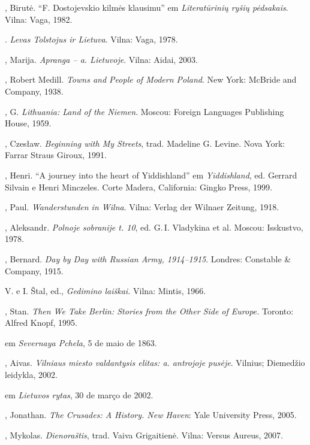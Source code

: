 \begin{bibliohedra}
  , Birutė. ``F. Dostojevskio kilmės klausimu'' em
  \textit{Literatūrinių ryšių pėdsakais}. Vilna: Vaga, 1982.

  \titidem. \textit{Levas Tolstojus ir Lietuva}. Vilna: Vaga,
  1978.

  , Marija. \textit{Apranga -- a. Lietuvoje}. Vilna:
  Aidai, 2003.

  , Robert Medill. \textit{Towns and People of Modern Poland}. New
  York: McBride and Company, 1938.

  , G. \textit{Lithuania: Land of the Niemen}. Moscou: Foreign
  Languages Publishing House, 1959.

  , Czesław. \textit{Beginning with My Streets}, trad. Madeline G.
  Levine. Nova York: Farrar Straus Giroux, 1991.

  , Henri. ``A journey into the heart of Yiddishland'' em
  \textit{Yiddishland}, ed. Gerrard Silvain e Henri Minczeles. Corte
  Madera, California: Gingko Press, 1999.

  , Paul. \textit{Wanderstunden in Wilna}. Vilna: Verlag der Wilnaer
  Zeitung, 1918.

  , Aleksandr. \textit{Polnoje sobranije t. 10}, ed. G.\,I.
  Vladykina et al. Moscou: Isskustvo, 1978.

  , Bernard. \textit{Day by Day with Russian Army, 1914--1915}.
  Londres: Constable \& Company, 1915.

   V. e I. Štal, ed., \textit{Gedimino laiškai.} Vilna: Mintis,
  1966.

  , Stan. \textit{Then We Take Berlin: Stories from the Other Side
  of Europe.} Toronto: Alfred Knopf, 1995.

   em \textit{Severnaya Pchela}, 5 de maio de 1863.

  , Aivas. \textit{Vilniaus miesto valdantysis elitas:  a.
  antrojoje pusėje}. Vilnius; Diemedžio leidykla, 2002.

   em \textit{Lietuvos rytas},
  30 de março de 2002.

  , Jonathan. \textit{The Crusades: A History. New Haven}: Yale
  University Press, 2005.

  , Mykolas. \textit{Dienoraštis}, trad. Vaiva Grigaitienė.
  Vilna: Versus Aureus, 2007.


\end{bibliohedra}
